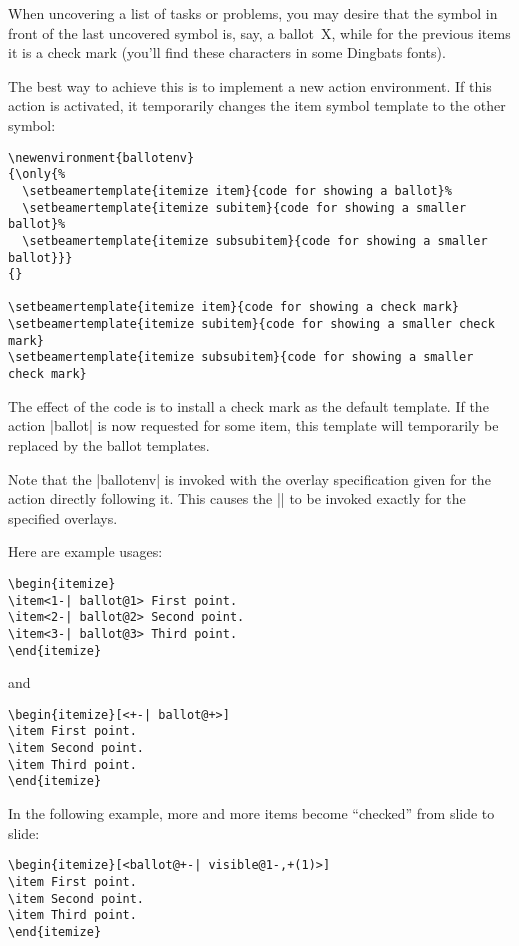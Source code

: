 When uncovering a list of tasks or problems, you may desire that the symbol in front of the last uncovered symbol is, say, a ballot~X, while for the previous items it is a check mark (you'll find these characters in some Dingbats fonts).

The best way to achieve this is to implement a new action environment. If this action is activated, it temporarily changes the item symbol template to the other symbol:
\begin{verbatim}
\newenvironment{ballotenv}
{\only{%
  \setbeamertemplate{itemize item}{code for showing a ballot}%
  \setbeamertemplate{itemize subitem}{code for showing a smaller ballot}%
  \setbeamertemplate{itemize subsubitem}{code for showing a smaller ballot}}}
{}

\setbeamertemplate{itemize item}{code for showing a check mark}
\setbeamertemplate{itemize subitem}{code for showing a smaller check mark}
\setbeamertemplate{itemize subsubitem}{code for showing a smaller check mark}
\end{verbatim}

The effect of the code is to install a check mark as the default template. If the action |ballot| is now requested for some item, this template will temporarily be replaced by the ballot templates.

Note that the |ballotenv| is invoked with the overlay specification given for the action directly following it. This causes the |\only| to be invoked exactly for the specified overlays.

Here are example usages:
\begin{verbatim}
\begin{itemize}
\item<1-| ballot@1> First point.
\item<2-| ballot@2> Second point.
\item<3-| ballot@3> Third point.
\end{itemize}
\end{verbatim}

and
\begin{verbatim}
\begin{itemize}[<+-| ballot@+>]
\item First point.
\item Second point.
\item Third point.
\end{itemize}
\end{verbatim}

In the following example, more and more items become ``checked'' from slide to slide:
\begin{verbatim}
\begin{itemize}[<ballot@+-| visible@1-,+(1)>]
\item First point.
\item Second point.
\item Third point.
\end{itemize}
\end{verbatim}

